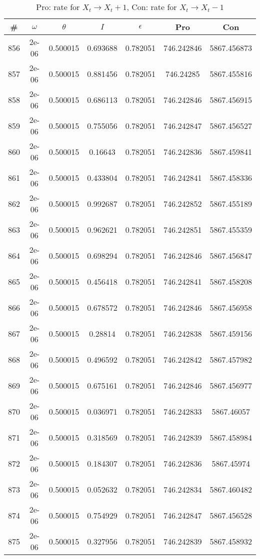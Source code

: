 \newpage
\begin{table}
\caption{Pro: rate for $X_t \rightarrow X_t + 1$, Con: rate for $X_t \rightarrow X_t - 1$}
\begin{tabular*}{\linewidth}{c|c|c|c|c|c|c}
\# & $\omega$ & $\theta$ & $I$ & $\epsilon$ & Pro & Con \\
\hline
856 & 2e-06 & 0.500015 & 0.693688 & 0.782051 & 746.242846 & 5867.456873\\
857 & 2e-06 & 0.500015 & 0.881456 & 0.782051 & 746.24285 & 5867.455816\\
858 & 2e-06 & 0.500015 & 0.686113 & 0.782051 & 746.242846 & 5867.456915\\
859 & 2e-06 & 0.500015 & 0.755056 & 0.782051 & 746.242847 & 5867.456527\\
860 & 2e-06 & 0.500015 & 0.16643 & 0.782051 & 746.242836 & 5867.459841\\
861 & 2e-06 & 0.500015 & 0.433804 & 0.782051 & 746.242841 & 5867.458336\\
862 & 2e-06 & 0.500015 & 0.992687 & 0.782051 & 746.242852 & 5867.455189\\
863 & 2e-06 & 0.500015 & 0.962621 & 0.782051 & 746.242851 & 5867.455359\\
864 & 2e-06 & 0.500015 & 0.698294 & 0.782051 & 746.242846 & 5867.456847\\
865 & 2e-06 & 0.500015 & 0.456418 & 0.782051 & 746.242841 & 5867.458208\\
866 & 2e-06 & 0.500015 & 0.678572 & 0.782051 & 746.242846 & 5867.456958\\
867 & 2e-06 & 0.500015 & 0.28814 & 0.782051 & 746.242838 & 5867.459156\\
868 & 2e-06 & 0.500015 & 0.496592 & 0.782051 & 746.242842 & 5867.457982\\
869 & 2e-06 & 0.500015 & 0.675161 & 0.782051 & 746.242846 & 5867.456977\\
870 & 2e-06 & 0.500015 & 0.036971 & 0.782051 & 746.242833 & 5867.46057\\
871 & 2e-06 & 0.500015 & 0.318569 & 0.782051 & 746.242839 & 5867.458984\\
872 & 2e-06 & 0.500015 & 0.184307 & 0.782051 & 746.242836 & 5867.45974\\
873 & 2e-06 & 0.500015 & 0.052632 & 0.782051 & 746.242834 & 5867.460482\\
874 & 2e-06 & 0.500015 & 0.754929 & 0.782051 & 746.242847 & 5867.456528\\
875 & 2e-06 & 0.500015 & 0.327956 & 0.782051 & 746.242839 & 5867.458932\\

\end{tabular*}
\end{table}
